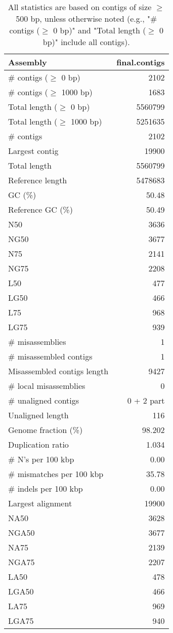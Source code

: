 \documentclass[12pt,a4paper]{article}
\begin{document}
\begin{table}[ht]
\begin{center}
\caption{All statistics are based on contigs of size $\geq$ 500 bp, unless otherwise noted (e.g., "\# contigs ($\geq$ 0 bp)" and "Total length ($\geq$ 0 bp)" include all contigs).}
\begin{tabular}{|l*{1}{|r}|}
\hline
Assembly & final.contigs \\ \hline
\# contigs ($\geq$ 0 bp) & 2102 \\ \hline
\# contigs ($\geq$ 1000 bp) & 1683 \\ \hline
Total length ($\geq$ 0 bp) & 5560799 \\ \hline
Total length ($\geq$ 1000 bp) & 5251635 \\ \hline
\# contigs & 2102 \\ \hline
Largest contig & 19900 \\ \hline
Total length & 5560799 \\ \hline
Reference length & 5478683 \\ \hline
GC (\%) & 50.48 \\ \hline
Reference GC (\%) & 50.49 \\ \hline
N50 & 3636 \\ \hline
NG50 & 3677 \\ \hline
N75 & 2141 \\ \hline
NG75 & 2208 \\ \hline
L50 & 477 \\ \hline
LG50 & 466 \\ \hline
L75 & 968 \\ \hline
LG75 & 939 \\ \hline
\# misassemblies & 1 \\ \hline
\# misassembled contigs & 1 \\ \hline
Misassembled contigs length & 9427 \\ \hline
\# local misassemblies & 0 \\ \hline
\# unaligned contigs & 0 + 2 part \\ \hline
Unaligned length & 116 \\ \hline
Genome fraction (\%) & 98.202 \\ \hline
Duplication ratio & 1.034 \\ \hline
\# N's per 100 kbp & 0.00 \\ \hline
\# mismatches per 100 kbp & 35.78 \\ \hline
\# indels per 100 kbp & 0.00 \\ \hline
Largest alignment & 19900 \\ \hline
NA50 & 3628 \\ \hline
NGA50 & 3677 \\ \hline
NA75 & 2139 \\ \hline
NGA75 & 2207 \\ \hline
LA50 & 478 \\ \hline
LGA50 & 466 \\ \hline
LA75 & 969 \\ \hline
LGA75 & 940 \\ \hline
\end{tabular}
\end{center}
\end{table}
\end{document}
